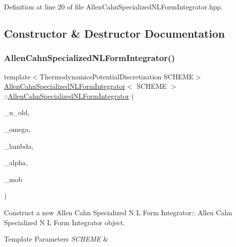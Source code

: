 Definition at line 20 of file Allen\+Cahn\+Specialized\+N\+L\+Form\+Integrator.\+hpp.



\subsection{Constructor \& Destructor Documentation}
\mbox{\label{classAllenCahnSpecializedNLFormIntegrator_abb6bd9b866d9d5777cd4f72d7aceb6c1}} 
\subsubsection{\texorpdfstring{Allen\+Cahn\+Specialized\+N\+L\+Form\+Integrator()}{AllenCahnSpecializedNLFormIntegrator()}}
{\footnotesize\ttfamily template$<$Thermodynamics\+Potential\+Discretization S\+C\+H\+E\+ME$>$ \\
\hyperlink{classAllenCahnSpecializedNLFormIntegrator}{Allen\+Cahn\+Specialized\+N\+L\+Form\+Integrator}$<$ S\+C\+H\+E\+ME $>$\+::\hyperlink{classAllenCahnSpecializedNLFormIntegrator}{Allen\+Cahn\+Specialized\+N\+L\+Form\+Integrator} (\begin{DoxyParamCaption}\item[{const mfem\+::\+Grid\+Function \&}]{\+\_\+u\+\_\+old,  }\item[{const double \&}]{\+\_\+omega,  }\item[{const double \&}]{\+\_\+lambda,  }\item[{const double \&}]{\+\_\+alpha,  }\item[{\hyperlink{classMobilityCoefficient}{Mobility\+Coefficient}}]{\+\_\+mob }\end{DoxyParamCaption})}



Construct a new Allen Cahn Specialized N L Form Integrator\+:\+: Allen Cahn Specialized N L Form Integrator object. 


\begin{DoxyTemplParams}{Template Parameters}
{\em S\+C\+H\+E\+ME} & \\
\hline
\end{DoxyTemplParams}

